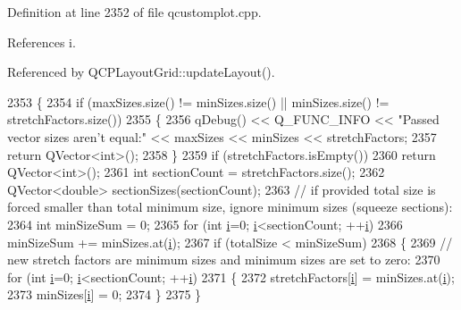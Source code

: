 Definition at line 2352 of file qcustomplot.\+cpp.



References i.



Referenced by Q\+C\+P\+Layout\+Grid\+::update\+Layout().


\begin{DoxyCode}
2353 \{
2354   \textcolor{keywordflow}{if} (maxSizes.size() != minSizes.size() || minSizes.size() != stretchFactors.size())
2355   \{
2356     qDebug() << Q\_FUNC\_INFO << \textcolor{stringliteral}{"Passed vector sizes aren't equal:"} << maxSizes << minSizes << 
      stretchFactors;
2357     \textcolor{keywordflow}{return} QVector<int>();
2358   \}
2359   \textcolor{keywordflow}{if} (stretchFactors.isEmpty())
2360     \textcolor{keywordflow}{return} QVector<int>();
2361   \textcolor{keywordtype}{int} sectionCount = stretchFactors.size();
2362   QVector<double> sectionSizes(sectionCount);
2363   \textcolor{comment}{// if provided total size is forced smaller than total minimum size, ignore minimum sizes (squeeze
       sections):}
2364   \textcolor{keywordtype}{int} minSizeSum = 0;
2365   \textcolor{keywordflow}{for} (\textcolor{keywordtype}{int} \hyperlink{_comparision_pictures_2_createtest_image_8m_a6f6ccfcf58b31cb6412107d9d5281426}{i}=0; \hyperlink{_comparision_pictures_2_createtest_image_8m_a6f6ccfcf58b31cb6412107d9d5281426}{i}<sectionCount; ++\hyperlink{_comparision_pictures_2_createtest_image_8m_a6f6ccfcf58b31cb6412107d9d5281426}{i})
2366     minSizeSum += minSizes.at(\hyperlink{_comparision_pictures_2_createtest_image_8m_a6f6ccfcf58b31cb6412107d9d5281426}{i});
2367   \textcolor{keywordflow}{if} (totalSize < minSizeSum)
2368   \{
2369     \textcolor{comment}{// new stretch factors are minimum sizes and minimum sizes are set to zero:}
2370     \textcolor{keywordflow}{for} (\textcolor{keywordtype}{int} \hyperlink{_comparision_pictures_2_createtest_image_8m_a6f6ccfcf58b31cb6412107d9d5281426}{i}=0; \hyperlink{_comparision_pictures_2_createtest_image_8m_a6f6ccfcf58b31cb6412107d9d5281426}{i}<sectionCount; ++\hyperlink{_comparision_pictures_2_createtest_image_8m_a6f6ccfcf58b31cb6412107d9d5281426}{i})
2371     \{
2372       stretchFactors[\hyperlink{_comparision_pictures_2_createtest_image_8m_a6f6ccfcf58b31cb6412107d9d5281426}{i}] = minSizes.at(\hyperlink{_comparision_pictures_2_createtest_image_8m_a6f6ccfcf58b31cb6412107d9d5281426}{i});
2373       minSizes[\hyperlink{_comparision_pictures_2_createtest_image_8m_a6f6ccfcf58b31cb6412107d9d5281426}{i}] = 0;
2374     \}
2375   \}

\end{DoxyCode}
